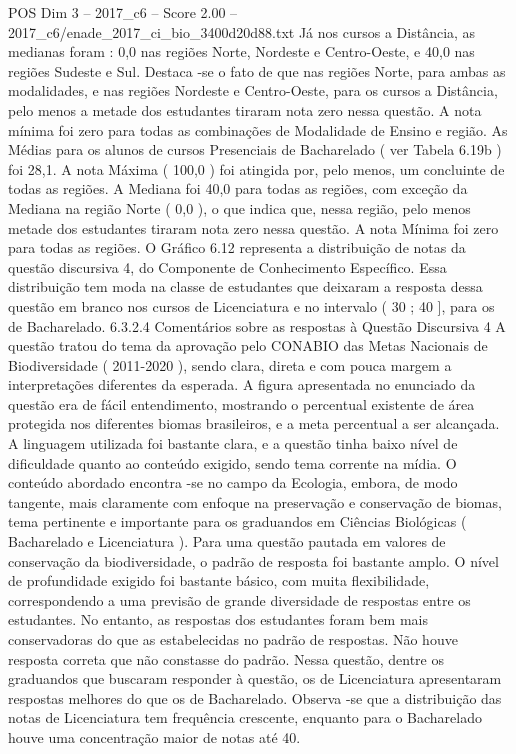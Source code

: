 \begin{textsample}{POS Dim 3 – 2017\_c6 – Score 2.00 – 2017\_c6/enade\_2017\_ci\_bio\_3400d20d88.txt}
Já nos cursos a Distância, as medianas foram : 0,0 nas regiões Norte, Nordeste e Centro-Oeste, e 40,0 nas regiões Sudeste e Sul.
Destaca -se o fato de que nas regiões Norte, para ambas as modalidades, e nas regiões Nordeste e Centro-Oeste, para os cursos a Distância, pelo menos a metade dos estudantes tiraram nota zero nessa questão.
A nota mínima foi zero para todas as combinações de Modalidade de Ensino e região.
As Médias para os alunos de cursos Presenciais de Bacharelado ( ver Tabela 6.19b ) foi 28,1.
A nota Máxima ( 100,0 ) foi atingida por, pelo menos, um concluinte de todas as regiões.
A Mediana foi 40,0 para todas as regiões, com exceção da Mediana na região Norte ( 0,0 ), o que indica que, nessa região, pelo menos metade dos estudantes tiraram nota zero nessa questão.
A nota Mínima foi zero para todas as regiões.
O Gráfico 6.12 representa a distribuição de notas da questão discursiva 4, do Componente de Conhecimento Específico.
Essa distribuição tem moda na classe de estudantes que deixaram a resposta dessa questão em branco nos cursos de Licenciatura e no intervalo ( 30 ; 40 ], para os de Bacharelado. 6.3.2.4 Comentários sobre as respostas à Questão Discursiva 4 A questão tratou do tema da aprovação pelo CONABIO das Metas Nacionais de Biodiversidade ( 2011-2020 ), sendo clara, direta e com pouca margem a interpretações diferentes da esperada.
A figura apresentada no enunciado da questão era de fácil entendimento, mostrando o percentual existente de área protegida nos diferentes biomas brasileiros, e a meta percentual a ser alcançada.
A linguagem utilizada foi bastante clara, e a questão tinha baixo nível de dificuldade quanto ao conteúdo exigido, sendo tema corrente na mídia.
O conteúdo abordado encontra -se no campo da Ecologia, embora, de modo tangente, mais claramente com enfoque na preservação e conservação de biomas, tema pertinente e importante para os graduandos em Ciências Biológicas ( Bacharelado e Licenciatura ).
Para uma questão pautada em valores de conservação da biodiversidade, o padrão de resposta foi bastante amplo.
O nível de profundidade exigido foi bastante básico, com muita flexibilidade, correspondendo a uma previsão de grande diversidade de respostas entre os estudantes.
No entanto, as respostas dos estudantes foram bem mais conservadoras do que as estabelecidas no padrão de respostas.
Não houve resposta correta que não constasse do padrão.
Nessa questão, dentre os graduandos que buscaram responder à questão, os de Licenciatura apresentaram respostas melhores do que os de Bacharelado.
Observa -se que a distribuição das notas de Licenciatura tem frequência crescente, enquanto para o Bacharelado houve uma concentração maior de notas até 40.

\end{textsample}
